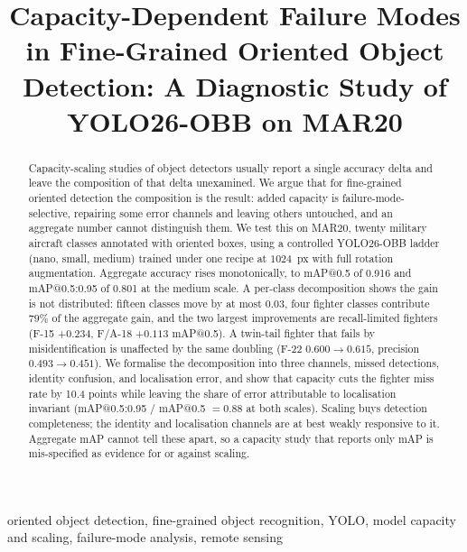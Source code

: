 \documentclass[conference]{IEEEtran}
\begin{document}
\title{Capacity-Dependent Failure Modes in Fine-Grained Oriented Object
Detection: A Diagnostic Study of YOLO26-OBB on MAR20}

\author{
}

\maketitle

\begin{abstract}
Capacity-scaling studies of object detectors usually report a single accuracy
delta and leave the composition of that delta unexamined. We argue that for
fine-grained oriented detection the composition is the result: added capacity is
failure-mode-selective, repairing some error channels and leaving others
untouched, and an aggregate number cannot distinguish them. We test this on
MAR20, twenty military aircraft classes annotated with oriented boxes, using a
controlled YOLO26-OBB ladder (nano, small, medium) trained under one recipe at
$1024$~px with full rotation augmentation. Aggregate accuracy rises
monotonically, to mAP@0.5 of 0.916 and mAP@0.5:0.95 of 0.801 at the medium
scale. A per-class decomposition shows the gain is not distributed: fifteen
classes move by at most 0.03, four fighter classes contribute $79\%$ of the
aggregate gain, and the two largest improvements are recall-limited fighters
(F-15 $+0.234$, F/A-18 $+0.113$ mAP@0.5). A twin-tail fighter that fails by
misidentification is unaffected by the same doubling (F-22 $0.600\rightarrow
0.615$, precision $0.493\rightarrow0.451$). We formalise the decomposition into
three channels, missed detections, identity confusion, and localisation error,
and show that capacity cuts the fighter miss rate by 10.4 points while leaving
the share of error attributable to localisation invariant (mAP@0.5:0.95 /
mAP@0.5 $=0.88$ at both scales). Scaling buys detection completeness; the
identity and localisation channels are at best weakly responsive to it.
Aggregate mAP cannot tell these apart, so
a capacity study that reports only mAP is mis-specified as evidence for or
against scaling.
\end{abstract}

\begin{IEEEkeywords}
oriented object detection, fine-grained object recognition, YOLO, model capacity
and scaling, failure-mode analysis, remote sensing
\end{IEEEkeywords}
\end{document}
